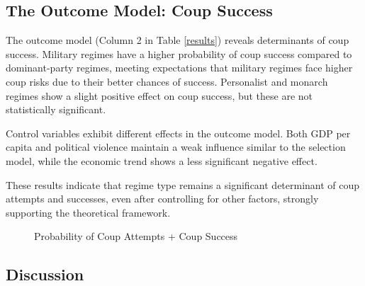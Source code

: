\documentclass[
  12pt,
]{report}
\begin{document}
\subsection{The Outcome Model: Coup
Success}\label{the-outcome-model-coup-success}

The outcome model (Column 2 in Table \ref{results}) reveals determinants
of coup success. Military regimes have a higher probability of coup
success compared to dominant-party regimes, meeting expectations that
military regimes face higher coup risks due to their better chances of
success. Personalist and monarch regimes show a slight positive effect
on coup success, but these are not statistically significant.

Control variables exhibit different effects in the outcome model. Both
GDP per capita and political violence maintain a weak influence similar
to the selection model, while the economic trend shows a less
significant negative effect.

These results indicate that regime type remains a significant
determinant of coup attempts and successes, even after controlling for
other factors, strongly supporting the theoretical framework.

\begin{figure}


\caption{\label{fig-margins}Probability of Coup Attempts + Coup Success}

\end{figure}%

\subsection{Discussion}\label{discussion}
\end{document}
